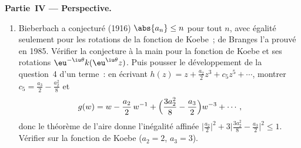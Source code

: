 \begin{problem}
\medskip
\noindent\textbf{Partie~IV --- Perspective.}
\begin{enumerate}[resume]
  \item Bieberbach a conjecturé (1916) $\abs{a_n} \leq n$
        pour tout $n$, avec égalité seulement pour les
        rotations de la fonction de Koebe~; de Branges l'a
        prouvé en 1985. Vérifier la conjecture à la main
        pour la fonction de Koebe et ses rotations
        $\eu^{-\iu\theta}k(\eu^{\iu\theta}z)$. Puis pousser
        le développement de la question~4 d'un terme~: en
        écrivant $h(z) = z + \frac{a_2}2z^3 + c_5z^5 +
        \cdots$, montrer $c_5 = \frac{a_3}2 -
        \frac{a_2^2}8$ et
        \[
        g(w) = w - \frac{a_2}{2}\,w^{-1} +
        \Bigl(\frac{3a_2^2}8 - \frac{a_3}2\Bigr)w^{-3} +
        \cdots ,
        \]
        donc le théorème de l'aire donne l'inégalité affinée
        $\bigl|\frac{a_2}2\bigr|^2 + 3\bigl|\frac{3a_2^2}8 -
        \frac{a_3}2\bigr|^2 \leq 1$. Vérifier sur la fonction
        de Koebe ($a_2 = 2$, $a_3 = 3$).
\end{enumerate}


\end{problem}
